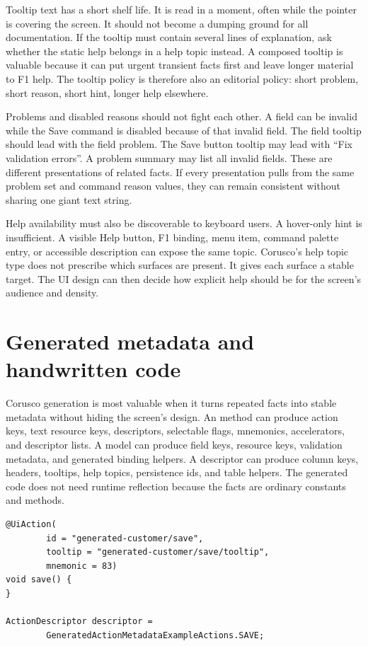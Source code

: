 Tooltip text has a short shelf life. It is read in a moment, often while the
pointer is covering the screen. It should not become a dumping ground for all
documentation. If the tooltip must contain several lines of explanation, ask
whether the static help belongs in a help topic instead. A composed tooltip is
valuable because it can put urgent transient facts first and leave longer
material to F1 help. The tooltip policy is therefore also an editorial policy:
short problem, short reason, short hint, longer help elsewhere.

Problems and disabled reasons should not fight each other. A field can be
invalid while the Save command is disabled because of that invalid field. The
field tooltip should lead with the field problem. The Save button tooltip may
lead with ``Fix validation errors''. A problem summary may list all invalid
fields. These are different presentations of related facts. If every
presentation pulls from the same problem set and command reason values, they
can remain consistent without sharing one giant text string.

Help availability must also be discoverable to keyboard users. A hover-only
hint is insufficient. A visible Help button, F1 binding, menu item, command
palette entry, or accessible description can expose the same topic. Corusco's
help topic type does not prescribe which surfaces are present. It gives each
surface a stable target. The UI design can then decide how explicit help
should be for the screen's audience and density.

\section{Generated metadata and handwritten code}

Corusco generation is most valuable when it turns repeated facts into stable
metadata without hiding the screen's design. An  method can
produce action keys, text resource keys, descriptors, selectable flags,
mnemonics, accelerators, and descriptor lists. A  model can
produce field keys, resource keys, validation metadata, and generated binding
helpers. A  descriptor can produce column keys, headers,
tooltips, help topics, persistence ids, and table helpers. The generated code
does not need runtime reflection because the facts are ordinary constants and
methods.

\begin{lstlisting}[caption={Generated action metadata is ordinary Java.}]
@UiAction(
        id = "generated-customer/save",
        tooltip = "generated-customer/save/tooltip",
        mnemonic = 83)
void save() {
}

ActionDescriptor descriptor =
        GeneratedActionMetadataExampleActions.SAVE;
\end{lstlisting}


